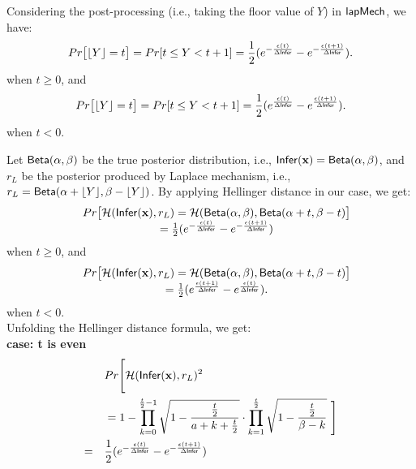 \documentclass{article}
\begin{document}
Considering the post-processing (i.e., taking the floor value of $Y$) in $\mathsf{lapMech}$, we have:
\[
Pr\big[\lfloor Y \rfloor = t\big] 
= Pr[ t \leq Y < t + 1] 
= \frac{1}{2} (e^{- \frac{\epsilon (t)}{\Delta \mathsf{Infer}}} - e^{- \frac{\epsilon (t + 1)}{\Delta \mathsf{Infer}}}).
\]
when $t \geq 0$, and
\[
Pr\big[\lfloor Y \rfloor = t\big] 
= Pr[ t \leq Y < t + 1] 
= \frac{1}{2} (e^{\frac{\epsilon (t)}{\Delta \mathsf{Infer}}} - e^{\frac{\epsilon (t + 1)}{\Delta \mathsf{Infer}}}).
\]
when $t < 0$.

Let $\mathsf{Beta}(\alpha, \beta)$ be the true posterior distribution, i.e., $\mathsf{Infer}(\textbf{x}) = \mathsf{Beta}(\alpha, \beta)$, and $r_L$ be the posterior produced by Laplace mechanism, i.e., $r_L = \mathsf{Beta}(\alpha + \lfloor Y \rfloor, \beta - \lfloor Y \rfloor)$. By applying Hellinger distance in our case, we get:
$$
\begin{array}{rcl}
& Pr\big[\mathcal{H}(\mathsf{Infer}(\textbf{x}), r_L ) 
= \mathcal{H}(\mathsf{Beta}(\alpha, \beta), \mathsf{Beta}(\alpha + t, \beta - t)\big] \\
& =  \frac{1}{2} (e^{- \frac{\epsilon (t)}{\Delta \mathsf{Infer}}} - e^{- \frac{\epsilon (t + 1)}{\Delta \mathsf{Infer}}})\\
\end{array}
$$
when $t \geq 0$, and\\
$$
\begin{array}{rcl}
& Pr\big[\mathcal{H}(\mathsf{Infer}(\textbf{x}), r_L ) 
= \mathcal{H}(\mathsf{Beta}(\alpha, \beta), \mathsf{Beta}(\alpha + t, \beta - t)\big]\\
& = \frac{1}{2} (e^{\frac{\epsilon (t + 1)}{\Delta \mathsf{Infer}}} - e^{\frac{\epsilon (t)}{\Delta \mathsf{Infer}}}).
\end{array}
$$
when $t < 0$.\\
Unfolding the Hellinger distance formula, we get:\\
  \noindent \textbf{case: t is even}\\
  \begin{align*}
  & Pr\Bigg[\mathcal{H}(\mathsf{Infer}(\textbf{x}), r_L )^2 \\
  & = 1 - \prod_{k = 0}^{\frac{t}{2} - 1}
  \sqrt{1 - \frac{\frac{t}{2}}{a + k + \frac{t}{2}}}
  \cdot
  \prod_{k = 1}^{\frac{t}{2}}
  \sqrt{1 - \frac{\frac{t}{2}}{\beta - k}}\ \Bigg] \\
  = \quad & \frac{1}{2} (e^{- \frac{\epsilon (t)}{\Delta \mathsf{Infer}}} - e^{- \frac{\epsilon (t + 1)}{\Delta \mathsf{Infer}}})\\
  \end{align*}
\end{document}
